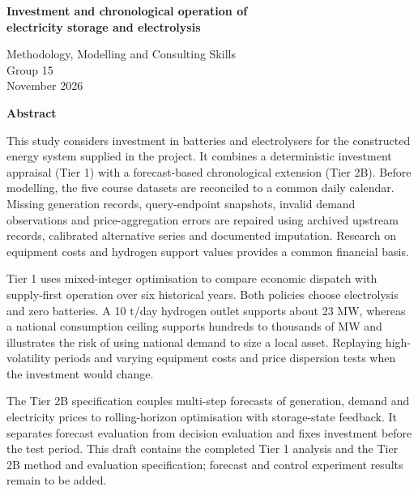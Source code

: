 \documentclass[11pt,a4paper,oneside]{article}
\begin{document}
\begin{center}
{\Large\bfseries Investment and chronological operation of\\[3pt]
electricity storage and electrolysis\par}
\vspace{12pt}
Methodology, Modelling and Consulting Skills\\
Group 15\\
November 2026
\end{center}
\vspace{16pt}
\begin{center}\large\bfseries Abstract\end{center}
\noindent
This study considers investment in batteries and electrolysers for the
constructed energy system supplied in the project. It combines a deterministic
investment appraisal (Tier 1) with a forecast-based chronological extension
(Tier 2B). Before modelling, the five course datasets are reconciled to a
common daily calendar. Missing generation records, query-endpoint snapshots,
invalid demand observations and price-aggregation errors are repaired using
archived upstream records, calibrated alternative series and documented
imputation. Research on equipment costs and hydrogen support values provides
a common financial basis.

Tier 1 uses mixed-integer optimisation to compare economic dispatch with
supply-first operation over six historical years. Both policies choose
electrolysis and zero batteries. A 10 t/day hydrogen outlet supports about
23 MW, whereas a national consumption ceiling supports hundreds to thousands
of MW and illustrates the risk of using national demand to size a local asset.
Replaying high-volatility periods and varying equipment costs and price
dispersion tests when the investment would change.

The Tier 2B specification couples multi-step forecasts of generation, demand
and electricity prices to rolling-horizon optimisation with storage-state
feedback. It separates forecast evaluation from decision evaluation and fixes
investment before the test period. This draft contains the completed Tier 1
analysis and the Tier 2B method and evaluation specification; forecast and
control experiment results remain to be added.
\clearpage
\tableofcontents
\clearpage
{}



\label{body-last}
\clearpage
\setcounter{page}{1}
\renewcommand{\thepage}{R\arabic{page}}

\clearpage
\setcounter{page}{1}
\renewcommand{\thepage}{A\arabic{page}}
\setcounter{chapter}{0}
\renewcommand{\thechapter}{\Alph{chapter}}
\providecommand{\theHchapter}{}
\renewcommand{\theHchapter}{appendix.\arabic{chapter}}

\end{document}
